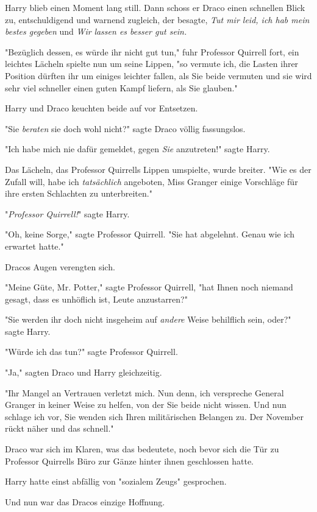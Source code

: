 {Harry blieb einen Moment lang still. Dann schoss er Draco einen schnellen Blick zu, entschuldigend und warnend zugleich, der besagte, \emph{Tut mir leid, ich hab mein bestes gegeben} und \emph{Wir} \emph{lassen es besser gut sein.}

"Bezüglich dessen, es würde ihr nicht gut tun," fuhr Professor Quirrell fort, ein leichtes Lächeln spielte nun um seine Lippen, "so vermute ich, die Lasten ihrer Position dürften ihr um einiges leichter fallen, als Sie beide vermuten und sie wird sehr viel schneller einen guten Kampf liefern, als Sie glauben."

Harry und Draco keuchten beide auf vor Entsetzen.

"Sie \emph{beraten} sie doch wohl nicht?" sagte Draco völlig fassungslos.

"Ich habe mich nie dafür gemeldet, gegen \emph{Sie} anzutreten!" sagte Harry.

Das Lächeln, das Professor Quirrells Lippen umspielte, wurde breiter. "Wie es der Zufall will, habe ich \emph{tatsächlich} angeboten, Miss Granger einige Vorschläge für ihre ersten Schlachten zu unterbreiten."

"\emph{Professor Quirrell!}" sagte Harry.

"Oh, keine Sorge," sagte Professor Quirrell. "Sie hat abgelehnt. Genau wie ich erwartet hatte."

Dracos Augen verengten sich.

"Meine Güte, Mr. Potter," sagte Professor Quirrell, "hat Ihnen noch niemand gesagt, dass es unhöflich ist, Leute anzustarren?"

"Sie werden ihr doch nicht insgeheim auf \emph{andere} Weise behilflich sein, oder?" sagte Harry.

"Würde ich das tun?" sagte Professor Quirrell.

"Ja," sagten Draco und Harry gleichzeitig.

"Ihr Mangel an Vertrauen verletzt mich. Nun denn, ich verspreche General Granger in keiner Weise zu helfen, von der Sie beide nicht wissen. Und nun schlage ich vor, Sie wenden sich Ihren militärischen Belangen zu. Der November rückt näher und das schnell."

\later

Draco war sich im Klaren, was das bedeutete, noch bevor sich die Tür zu Professor Quirrells Büro zur Gänze hinter ihnen geschlossen hatte.

Harry hatte einst abfällig von "sozialem Zeugs" gesprochen.

Und nun war das Dracos einzige Hoffnung.

}
